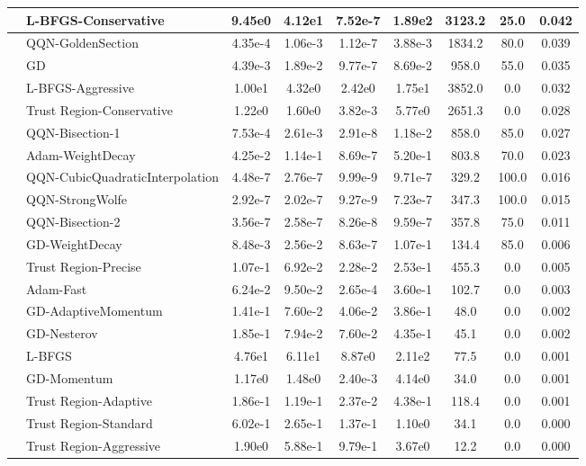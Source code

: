 \documentclass[10pt]{article}
\begin{document}
\begin{longtable}{|l|l|c|c|c|c|c|c|c|}
\hline
 & L-BFGS-Conservative & 9.45e0 & 4.12e1 & 7.52e-7 & 1.89e2 & 3123.2 & 25.0 & 0.042 \\
\hline
 & QQN-GoldenSection & 4.35e-4 & 1.06e-3 & 1.12e-7 & 3.88e-3 & 1834.2 & 80.0 & 0.039 \\
\hline
 & GD & 4.39e-3 & 1.89e-2 & 9.77e-7 & 8.69e-2 & 958.0 & 55.0 & 0.035 \\
\hline
 & L-BFGS-Aggressive & 1.00e1 & 4.32e0 & 2.42e0 & 1.75e1 & 3852.0 & 0.0 & 0.032 \\
\hline
 & Trust Region-Conservative & 1.22e0 & 1.60e0 & 3.82e-3 & 5.77e0 & 2651.3 & 0.0 & 0.028 \\
\hline
 & QQN-Bisection-1 & 7.53e-4 & 2.61e-3 & 2.91e-8 & 1.18e-2 & 858.0 & 85.0 & 0.027 \\
\hline
 & Adam-WeightDecay & 4.25e-2 & 1.14e-1 & 8.69e-7 & 5.20e-1 & 803.8 & 70.0 & 0.023 \\
\hline
 & QQN-CubicQuadraticInterpolation & 4.48e-7 & 2.76e-7 & 9.99e-9 & 9.71e-7 & 329.2 & 100.0 & 0.016 \\
\hline
 & QQN-StrongWolfe & 2.92e-7 & 2.02e-7 & 9.27e-9 & 7.23e-7 & 347.3 & 100.0 & 0.015 \\
\hline
 & QQN-Bisection-2 & 3.56e-7 & 2.58e-7 & 8.26e-8 & 9.59e-7 & 357.8 & 75.0 & 0.011 \\
\hline
 & GD-WeightDecay & 8.48e-3 & 2.56e-2 & 8.63e-7 & 1.07e-1 & 134.4 & 85.0 & 0.006 \\
\hline
 & Trust Region-Precise & 1.07e-1 & 6.92e-2 & 2.28e-2 & 2.53e-1 & 455.3 & 0.0 & 0.005 \\
\hline
 & Adam-Fast & 6.24e-2 & 9.50e-2 & 2.65e-4 & 3.60e-1 & 102.7 & 0.0 & 0.003 \\
\hline
 & GD-AdaptiveMomentum & 1.41e-1 & 7.60e-2 & 4.06e-2 & 3.86e-1 & 48.0 & 0.0 & 0.002 \\
\hline
 & GD-Nesterov & 1.85e-1 & 7.94e-2 & 7.60e-2 & 4.35e-1 & 45.1 & 0.0 & 0.002 \\
\hline
 & L-BFGS & 4.76e1 & 6.11e1 & 8.87e0 & 2.11e2 & 77.5 & 0.0 & 0.001 \\
\hline
 & GD-Momentum & 1.17e0 & 1.48e0 & 2.40e-3 & 4.14e0 & 34.0 & 0.0 & 0.001 \\
\hline
 & Trust Region-Adaptive & 1.86e-1 & 1.19e-1 & 2.37e-2 & 4.38e-1 & 118.4 & 0.0 & 0.001 \\
\hline
 & Trust Region-Standard & 6.02e-1 & 2.65e-1 & 1.37e-1 & 1.10e0 & 34.1 & 0.0 & 0.000 \\
\hline
 & Trust Region-Aggressive & 1.90e0 & 5.88e-1 & 9.79e-1 & 3.67e0 & 12.2 & 0.0 & 0.000 \\

\end{longtable}
\end{document}
